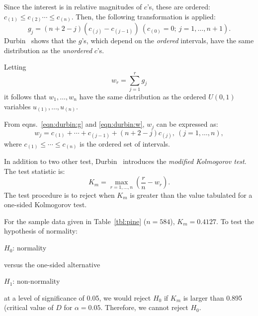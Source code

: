\documentclass[draft]{article}
\newenvironment{example}{%
   \vspace{\baselineskip}
   \par\noindent\hrulefill\par
   \noindent{\em Example:}}{%
   \par\noindent\hrulefill\par
   \vspace{\baselineskip}}
\begin{document}
Since the interest is in relative magnitudes of \(c\)'s, these
are ordered:
\(c_{\left(1\right)} \le c_{\left(2\right)} \cdots 
\le c_{\left(n\right)}\). Then, the following transformation
is applied:
\begin{equation}
\label{eqn:durbin:g}
g_j=\left(n+2-j\right)\left(c_{\left(j\right)}
-c_{\left(j-1\right)}\right)\:
\left(c_{\left(0\right)}=0;\: j=1,\ldots,n+1\right).
\end{equation}
Durbin~\cite{durbin61} shows that the \(g\)'s, which depend
on the {\em ordered\/} intervals, have the same
distribution as the {\em unordered\/} \(c\)'s.

Letting
\begin{equation}
\label{eqn:durbin:w}
w_r = \sum_{j=1}^r g_j
\end{equation}
it follows that \(w_1, \ldots, w_n\) have the same distribution
as the ordered \(U\left(0,1\right)\) variables
\(u_{\left(1\right)}, \ldots, u_{\left(n\right)}\). 

From eqns.~\ref{eqn:durbin:g} and \ref{eqn:durbin:w}, \(w_j\)
can be expressed as:
\begin{equation}
w_j=c_{\left(1\right)} + \cdots
+ c_{\left(j-1\right)} + \left(n+2-j\right)c_{\left(j\right)},\:
\left(j=1,\ldots,n\right),
\end{equation}
where
\(c_{\left(1\right)} \le \cdots \le c_{\left(n\right)}\) is
the ordered set of intervals.

In addition to two other test, Durbin~\cite{durbin61} introduces
the {\em modified Kolmogorov test}. The test statistic is:
\begin{equation}
K_m = \max_{r=1,\ldots,n}\left(\frac{r}{n}-w_r\right).
\end{equation}
The test procedure is to reject when \(K_m\) is greater
than the value tabulated for a one-sided Kolmogorov test.

\begin{example}
For the sample data given in Table~\ref{tbl:pine} (\(n=584\)), 
\(K_m = 0.4127\). To test the
hypothesis of normality:

\(H_0\): normality

\noindent versus the one-sided alternative

\(H_1\): non-normality

\noindent at a level of significance of 0.05, we would
reject \(H_0\) if \(K_m\) is larger
than 0.895 (critical value of \(D\) for \(\alpha=0.05\).  
Therefore, we cannot reject \(H_0\).
\end{example}
\end{document}
